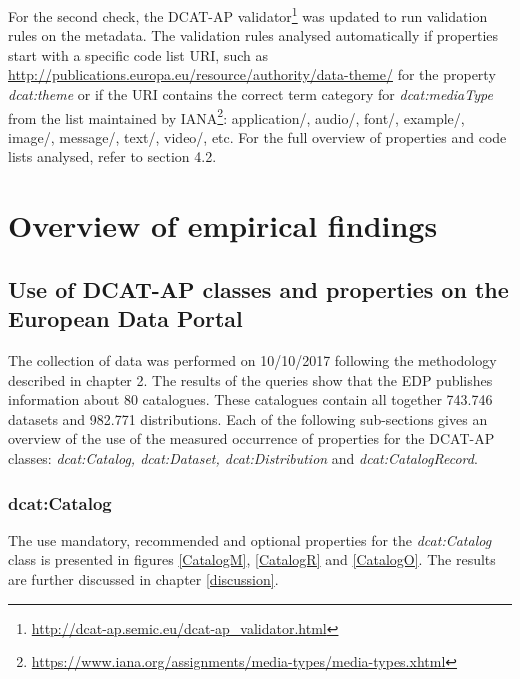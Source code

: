 \documentclass[<options>]{elsarticle}
\begin{document}
For the second check, the DCAT-AP validator\footnote{\href{ http://dcat-ap.semic.eu/dcat-ap_validator.html}{ http://dcat-ap.semic.eu/dcat-ap\_validator.html}} was updated to run validation rules on the metadata. The validation rules analysed automatically if properties start with a specific code list URI, such as \url{http://publications.europa.eu/resource/authority/data-theme/} for the property \textit{dcat:theme} or if the URI contains the correct term category for \textit{dcat:mediaType} from the list maintained by IANA\footnote{\href{  https://www.iana.org/assignments/media-types/media-types.xhtml}{https://www.iana.org/assignments/media-types/media-types.xhtml}}: application/, audio/, font/, example/, image/, message/, text/, video/, etc.  For the full overview of properties and code lists analysed, refer to section 4.2. 
% 
% 
% 

\section{Overview of empirical findings}
\label{EmpiricalFindings}
\subsection{Use of DCAT-AP classes and properties on the European Data Portal} \label{EDPUse}
The collection of data was performed on 10/10/2017 following the methodology described in chapter 2. The results of the queries show that the EDP publishes information about 80 catalogues. These catalogues contain all together 743.746 datasets and 982.771 distributions. Each of the following sub-sections gives an overview of the use of the measured occurrence of properties for the DCAT-AP classes: \textit{dcat:Catalog, dcat:Dataset, dcat:Distribution} and \textit{dcat:CatalogRecord}.
\subsubsection{dcat:Catalog}
The use mandatory, recommended and optional properties for the \textit{dcat:Catalog} class is presented in figures \ref{CatalogM}, \ref{CatalogR} and \ref{CatalogO}. The results are further discussed in chapter \ref{discussion}.
\end{document}
